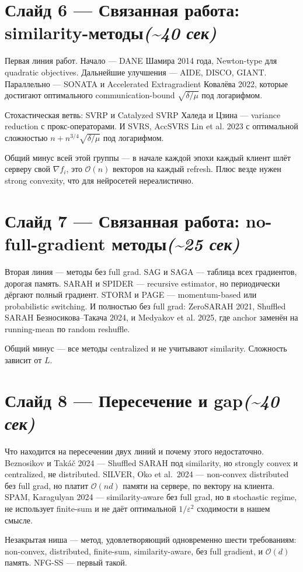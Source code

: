 \documentclass[11pt,a4paper]{article}
\newcommand{\slide}[3]{%
  \section*{Слайд #1 — #2\hfill\normalsize\color{lighttext}\textit{(\textasciitilde #3)}}%
}
\begin{document}
\slide{6}{Связанная работа: similarity-методы}{40 сек}

Первая линия работ. Начало — DANE Шамира 2014 года, Newton-type для quadratic objectives. Дальнейшие улучшения — AIDE, DISCO, GIANT. Параллельно — SONATA и Accelerated Extragradient Ковалёва 2022, которые достигают оптимального communication-bound $\sqrt{\delta/\mu}$ под логарифмом.

Стохастическая ветвь: SVRP и Catalyzed SVRP Халеда и Цзина — variance reduction с прокс-операторами. И SVRS, AccSVRS Lin et al. 2023 с оптимальной сложностью $n + n^{3/4}\sqrt{\delta/\mu}$ под логарифмом.

Общий минус всей этой группы — в начале каждой эпохи каждый клиент шлёт серверу свой $\nabla f_i$, это $\mathcal{O}(n)$ векторов на каждый refresh. Плюс везде нужен strong convexity, что для нейросетей нереалистично.

\slide{7}{Связанная работа: no-full-gradient методы}{25 сек}

Вторая линия — методы без full grad. SAG и SAGA — таблица всех градиентов, дорогая память. SARAH и SPIDER — recursive estimator, но периодически дёргают полный градиент. STORM и PAGE — momentum-based или probabilistic switching. И полностью без full grad: ZeroSARAH 2021, Shuffled SARAH Безносикова--Такача 2024, и Medyakov et al. 2025, где anchor заменён на running-mean по random reshuffle.

Общий минус — все методы centralized и не учитывают similarity. Сложность зависит от $L$.

\slide{8}{Пересечение и gap}{40 сек}

Что находится на пересечении двух линий и почему этого недостаточно. Beznosikov и Takáč 2024 — Shuffled SARAH под similarity, но strongly convex и centralized, не distributed. SILVER, Oko et al.~2024 — non-convex distributed без full grad, но платит $\mathcal{O}(nd)$ памяти на сервере, по вектору на клиента. SPAM, Karagulyan 2024 — similarity-aware без full grad, но в stochastic regime, не использует finite-sum и не даёт оптимальной $1/\varepsilon^2$ сходимости в нашем смысле.

Незакрытая ниша — метод, удовлетворяющий одновременно шести требованиям: non-convex, distributed, finite-sum, similarity-aware, без full gradient, и $\mathcal{O}(d)$ память. NFG-SS — первый такой.
\end{document}
